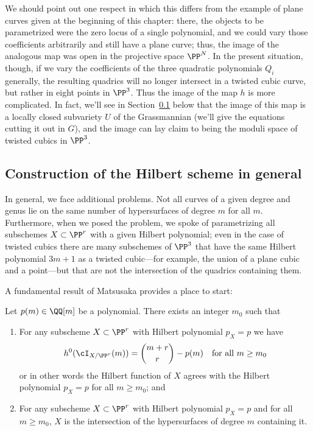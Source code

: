 We should point out one respect in which this differs from the example of plane curves given at the beginning of this chapter: there, the objects to be parametrized were the zero locus of a single polynomial, and we could vary those coefficients arbitrarily and still have a plane curve; thus, the image of the analogous map was open in the projective space $\PP^N$. In the present situation, though, if we vary the coefficients of the three quadratic polynomials $Q_i$ generally, the resulting quadrics will no longer intersect in a twisted cubic curve, but rather in eight points in $\PP^3$. Thus the image of the map $h$ is more complicated.
In fact, we'll see in Section~\ref{} below that the image of this map is a locally closed subvariety $U$ of the Grassmannian (we'll give the equations cutting it out in $G$), and the image can lay claim to being the moduli space of twisted cubics in $\PP^3$.

\subsection{Construction of the Hilbert scheme in general}

In general, we face additional problems. Not all curves of a given degree and genus lie on the same number of hypersurfaces of degree $m$ for all $m$. Furthermore, when we posed the problem, we spoke of parametrizing all subschemes $X \subset \PP^r$ with a given Hilbert polynomial; even in the case of twisted cubics there are many subschemes of $\PP^3$ that have the same Hilbert polynomial $3m+1$ as a twisted cubic---for example, the union of a plane cubic and a point---but that are not the intersection of the quadrics containing them.

A fundamental result of Matsusaka provides a place to start:

\begin{lemma}\label{matsusaka}
Let $p(m) \in \QQ[m]$ be a polynomial. There exists an integer $m_0$ such that

\begin{enumerate}  

\item For any subscheme $X \subset \PP^r$ with Hilbert polynomial $p_X = p$ we have
$$
h^0(\cI_{X/\PP^r}(m)) = \binom{m+r}{r} - p(m) \quad \text{for all } m \geq m_0
$$
or in other words the Hilbert function of $X$ agrees with the Hilbert polynomial $p_X = p$ for all $m \geq m_0$; and

\item For any subscheme $X \subset \PP^r$ with Hilbert polynomial $p_X = p$ and for all $m \geq m_0$, $X$ is the intersection of the hypersurfaces of degree $m$ containing it.
\end{enumerate}
\end{lemma}

